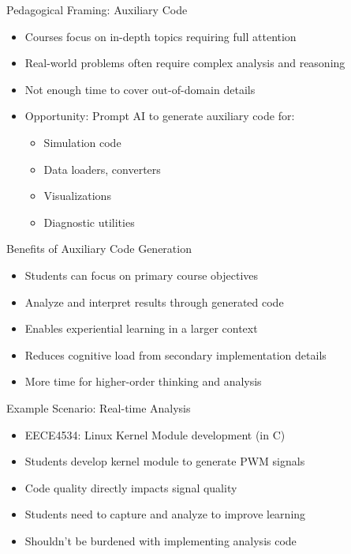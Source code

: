 \documentclass[xcolor={dvipsnames}, aspectratio=169]{beamer}
\begin{document}
\begin{frame}{Pedagogical Framing: Auxiliary Code}
  \begin{itemize}
    \item Courses focus on in-depth topics requiring full attention
    \item Real-world problems often require complex analysis and reasoning
    \item Not enough time to cover out-of-domain details
    \item Opportunity: Prompt AI to generate auxiliary code for:
      \begin{itemize}
        \item Simulation code
        \item Data loaders, converters
        \item Visualizations
        \item Diagnostic utilities
      \end{itemize}
  \end{itemize}
\end{frame}

\begin{frame}{Benefits of Auxiliary Code Generation}
  \begin{itemize}
    \item Students can focus on primary course objectives
    \item Analyze and interpret results through generated code
    \item Enables experiential learning in a larger context
    \item Reduces cognitive load from secondary implementation details
    \item More time for higher-order thinking and analysis
  \end{itemize}
\end{frame}

\begin{frame}{Example Scenario: Real-time Analysis}
  \begin{itemize}
    \item EECE4534: Linux Kernel Module development (in C)
    \item Students develop kernel module to generate PWM signals
    \item Code quality directly impacts signal quality
    \item Students need to capture and analyze to improve learning
    \item Shouldn't be burdened with implementing analysis code
  \end{itemize}
\end{frame}
\end{document}

